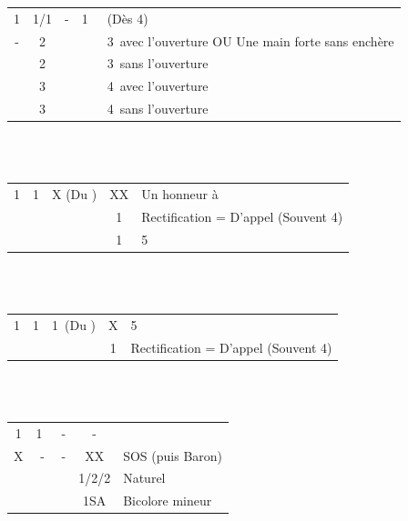 \documentclass[a4paper, oneside, 11pt]{report}
\begin{document}
	\begin{tabular}{cccc|l}
	1\trefle & 1\carreau/1\coeur  & - & 1\pique\ & (Dès 4\pique)\\
	- & 2\trefle &&& 3\pique\ avec l'ouverture OU Une main forte sans enchère\\
	& 2\pique &&& 3\pique\ sans l'ouverture\\
	& 3\trefle &&& 4\pique\ avec l'ouverture\\
	& 3\pique &&& 4\pique\ sans l'ouverture\\
	\end{tabular}\\\\

	\begin{tabular}{cccc|l}
	1\trefle & 1\carreau & X (Du \coeur) & XX & Un honneur à \carreau\\
	&&& 1\coeur & Rectification = D'appel (Souvent 4\pique)\\
	&&& 1\pique & 5\pique\\
	\end{tabular}\\\\

	\begin{tabular}{cccc|l}
	1\trefle & 1\carreau & 1\coeur\ (Du \pique) & X & 5\coeur\\
	&&& 1\pique & Rectification = D'appel (Souvent 4\coeur)\\
	\end{tabular}\\\\

	\begin{tabular}{cccc|l}
	1\trefle & 1\coeur\  & - & - &\\
	X & - & - & XX & SOS (puis Baron)\\
	&&& 1\pique/2\trefle/2\carreau & Naturel\\
	&&& 1SA & Bicolore mineur\\
	\end{tabular}\\\\
\end{document}
